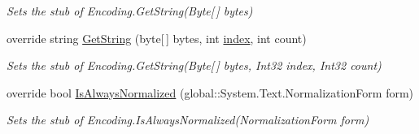 \begin{DoxyCompactItemize}
\begin{DoxyCompactList}\small\item\em Sets the stub of Encoding.\-Get\-String(\-Byte\mbox{[}$\,$\mbox{]} bytes)\end{DoxyCompactList}\item 
override string \hyperlink{class_system_1_1_text_1_1_fakes_1_1_stub_encoding_afe3958198fa70611075ac05f3645b245}{Get\-String} (byte\mbox{[}$\,$\mbox{]} bytes, int \hyperlink{jquery-1_810_82-vsdoc_8js_a75bb12d1f23302a9eea93a6d89d0193e}{index}, int count)
\begin{DoxyCompactList}\small\item\em Sets the stub of Encoding.\-Get\-String(\-Byte\mbox{[}$\,$\mbox{]} bytes, Int32 index, Int32 count)\end{DoxyCompactList}\item 
override bool \hyperlink{class_system_1_1_text_1_1_fakes_1_1_stub_encoding_a61d1f8afc6c834b46d54207ad6f31636}{Is\-Always\-Normalized} (global\-::\-System.\-Text.\-Normalization\-Form form)
\begin{DoxyCompactList}\small\item\em Sets the stub of Encoding.\-Is\-Always\-Normalized(\-Normalization\-Form form)\end{DoxyCompactList}\end{DoxyCompactItemize}
